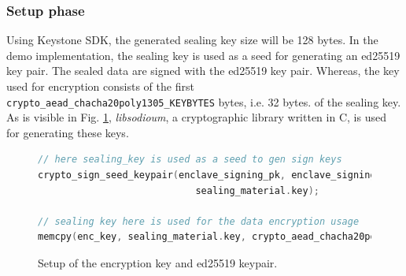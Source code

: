 \subsubsection{Setup phase}
Using Keystone SDK, the generated sealing key size will be 128 bytes. In the demo implementation, the sealing key is used as a seed for generating an ed25519 key pair. The sealed data are signed with the ed25519 key pair. Whereas, the key used for encryption consists of the first \texttt{crypto\_aead\_chacha20poly1305\_KEYBYTES} bytes, i.e. 32 bytes. of the sealing key. As is visible in Fig. \ref{setup-seal-material}, \textit{libsodioum}, a cryptographic library written in C, is used for generating these keys. \\
\begin{figure}[h!]
\begin{lstlisting}[language=C,frame=single]
// here sealing_key is used as a seed to gen sign keys
crypto_sign_seed_keypair(enclave_signing_pk, enclave_signing_sk,
                            sealing_material.key);

// sealing key here is used for the data encryption usage
memcpy(enc_key, sealing_material.key, crypto_aead_chacha20poly1305_KEYBYTES); 
\end{lstlisting}
\caption{Setup of the encryption key and ed25519 keypair. \label{setup-seal-material}}
\end{figure}

